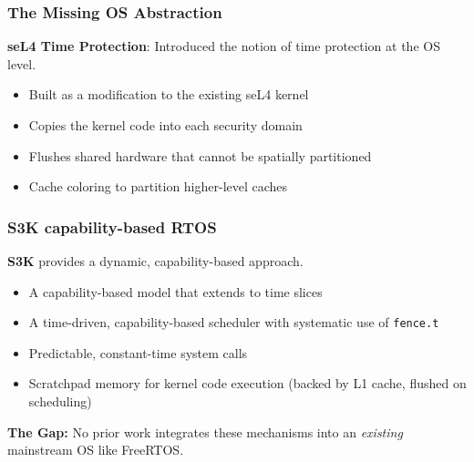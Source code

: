 \begin{frame}
\frametitle{The Missing OS Abstraction}
\textbf{seL4 Time Protection}: Introduced the notion of time protection at the OS level.

\begin{itemize}
  \item Built as a modification to the existing seL4 kernel
  \item Copies the kernel code into each security domain
  \item Flushes shared hardware that cannot be spatially partitioned
  \item Cache coloring to partition higher-level caches
\end{itemize}

\vspace{0.2cm}
\tiny{}
\end{frame}
\begin{frame}
\frametitle{S3K capability-based RTOS}
\textbf{S3K} provides a dynamic, capability-based approach.

\begin{itemize}
  \item A capability-based model that extends to time slices
  \item A time-driven, capability-based scheduler with systematic use of \texttt{fence.t}
  \item Predictable, constant-time system calls
  \item Scratchpad memory for kernel code execution (backed by L1 cache, flushed on scheduling)
\end{itemize}

\textbf{The Gap:} No prior work integrates these mechanisms into an \textit{existing} mainstream OS like FreeRTOS.

\vspace{0.2cm}
\tiny{}

\end{frame}
